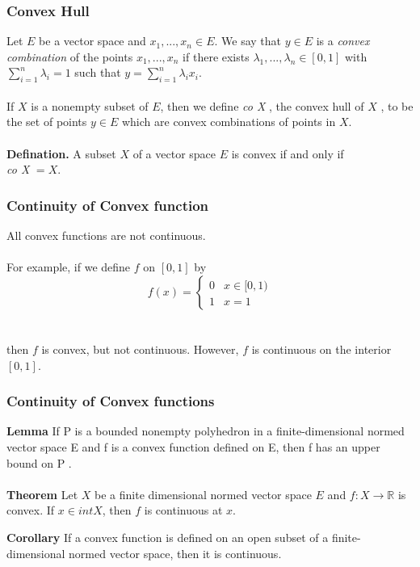 \documentclass{beamer}
\newcommand{\R}{\mathbb{R}}
\begin{document}
\begin{frame}
\frametitle{Convex Hull}
Let $E$ be a vector space and $x_1 ,..., x_n \in E$. We say that $y \in E$ is a \textit{convex combination} of the points $x_1 ,..., x_n$ if there exists $\lambda_1 ,..., \lambda_n \in [0,1]$ with $\sum_{i=1}^n \lambda_i = 1$ such that $ y = \sum_{i=1}^n \lambda_i x_i$.  \\~\\

If $X$ is a nonempty subset of $E$, then we
define \textit{co X} , the convex hull of $X$ , to be the set of points $y \in E$ which are convex
combinations of points in $X$.\\~\\

\textbf{Defination.} A subset $X$ of a vector space $E$ is convex if and only if \\ 
\hspace{3cm} \textit{co X} $= X$.
  
\end{frame}

\begin{frame}
\frametitle{Continuity of Convex function}
All convex functions are not continuous. \\~\\

For example, if we define $f$ on $[0,1]$ by \\


\[ f(x) = \begin{cases} 
      0 & x\in [0,1) \\
      1 & x = 1 
   \end{cases}
\]
\\~\\
then $f$ is convex, but not continuous. However, $f$ is continuous on the interior $[0,1]$.



\end{frame}

\begin{frame}
\frametitle{Continuity of Convex functions}
\textbf{Lemma} If P is a bounded nonempty polyhedron in a finite-dimensional normed vector space E and f is a convex function defined on E, then f has an upper bound on P . \\~\\

\textbf{Theorem} Let $X$ be a finite dimensional normed vector space $E$ and $f: X \to \R$ is convex. If $x \in int X$, then $f$ is continuous at $x$.

\textbf{Corollary} If a convex function is defined on an open subset of a finite-dimensional normed vector space, then it is continuous.

\end{frame}
\end{document}
